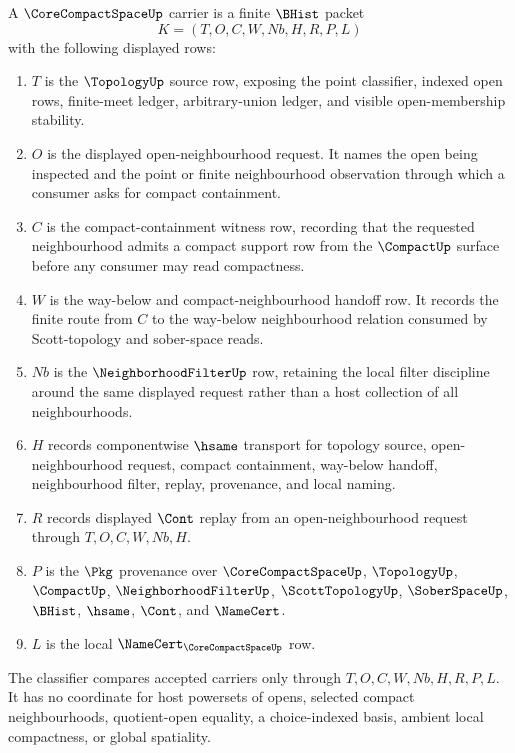 \begin{definition}
\label{def:core-compact-space-carrier}
A $\CoreCompactSpaceUp$ carrier is a finite $\BHist$ packet
$$
K=(T,O,C,W,Nb,H,R,P,L)
$$
with the following displayed rows:
\begin{enumerate}
\item $T$ is the $\TopologyUp$ source row, exposing the point classifier, indexed open rows, finite-meet ledger, arbitrary-union ledger, and visible open-membership stability.
\item $O$ is the displayed open-neighbourhood request. It names the open being inspected and the point or finite neighbourhood observation through which a consumer asks for compact containment.
\item $C$ is the compact-containment witness row, recording that the requested neighbourhood admits a compact support row from the $\CompactUp$ surface before any consumer may read compactness.
\item $W$ is the way-below and compact-neighbourhood handoff row. It records the finite route from $C$ to the way-below neighbourhood relation consumed by Scott-topology and sober-space reads.
\item $Nb$ is the $\NeighborhoodFilterUp$ row, retaining the local filter discipline around the same displayed request rather than a host collection of all neighbourhoods.
\item $H$ records componentwise $\hsame$ transport for topology source, open-neighbourhood request, compact containment, way-below handoff, neighbourhood filter, replay, provenance, and local naming.
\item $R$ records displayed $\Cont$ replay from an open-neighbourhood request through $T,O,C,W,Nb,H$.
\item $P$ is the $\Pkg$ provenance over $\CoreCompactSpaceUp$, $\TopologyUp$, $\CompactUp$, $\NeighborhoodFilterUp$, $\ScottTopologyUp$, $\SoberSpaceUp$, $\BHist$, $\hsame$, $\Cont$, and $\NameCert$.
\item $L$ is the local $\NameCert_{\CoreCompactSpaceUp}$ row.
\end{enumerate}
The classifier compares accepted carriers only through $T,O,C,W,Nb,H,R,P,L$. It has no coordinate for host powersets of opens, selected compact neighbourhoods, quotient-open equality, a choice-indexed basis, ambient local compactness, or global spatiality.
\end{definition}


